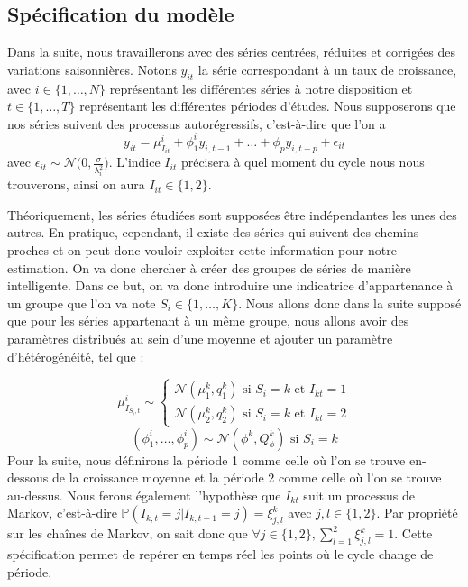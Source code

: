 \documentclass[10pt,french,french]{article}
\begin{document}
\hypertarget{spuxe9cification-du-moduxe8le}{%
\subsection{Spécification du modèle}\label{spuxe9cification-du-moduxe8le}}

Dans la suite, nous travaillerons avec des séries centrées, réduites et corrigées des variations saisonnières. Notons \(y_{it}\) la série correspondant à un taux de croissance, avec \(i \in \{1, \dots, N\}\) représentant les différentes séries à notre disposition et \(t \in \{1, \dots, T\}\) représentant les différentes périodes d'études. Nous supposerons que nos séries suivent des processus autorégressifs, c'est-à-dire que l'on a
\[ y_{it} = \mu_{I_{it}}^{i} + \phi_1^i y_{i,t-1} + \dots + \phi_p y_{i,t-p} + \epsilon_{it}\]
avec \(\epsilon_{it} \sim \mathcal{N}\big(0, \displaystyle\frac{\sigma}{\lambda_i^2}\big)\). L'indice \(I_{it}\) précisera à quel moment du cycle nous nous trouverons, ainsi on aura \(I_{it} \in \{1,2\}\).

Théoriquement, les séries étudiées sont supposées être indépendantes les unes des autres. En pratique, cependant, il existe des séries qui suivent des chemins proches et on peut donc vouloir exploiter cette information pour notre estimation. On va donc chercher à créer des groupes de séries de manière intelligente. Dans ce but, on va donc introduire une indicatrice d'appartenance à un groupe que l'on va note \(S_i \in \{1, \dots, K \}\). Nous allons donc dans la suite supposé que pour les séries appartenant à un même groupe, nous allons avoir des paramètres distribués au sein d'une moyenne et ajouter un paramètre d'hétérogénéité, tel que :

\[ \mu_{I_{S_i,t}}^i \sim \begin{cases}
\mathcal{N}(\mu_1^k,q_1^k) \text{ si } S_i = k \text{ et } I_{kt} = 1\\
\mathcal{N}(\mu_2^k,q_2^k) \text{ si } S_i = k \text{ et } I_{kt} = 2
\end{cases} \]
\[ (\phi_1^i, \dots, \phi_p^i) \sim \mathcal{N}(\phi^k,Q_{\phi}^k) \text{ si } S_i = k\]
Pour la suite, nous définirons la période 1 comme celle où l'on se trouve en-dessous de la croissance moyenne et la période 2 comme celle où l'on se trouve au-dessus. Nous ferons également l'hypothèse que \(I_{kt}\) suit un processus de Markov, c'est-à-dire \(\mathbb{P}(I_{k,t} = j | I_{k,t-1} = j) = \xi_{j,l}^k\) avec \(j,l \in \{1,2\}\). Par propriété sur les chaînes de Markov, on sait donc que \(\forall j \in \{1,2\}, \sum\limits_{l=1}^2 \xi_{j,l}^k = 1\). Cette spécification permet de repérer en temps réel les points où le cycle change de période.
\end{document}
